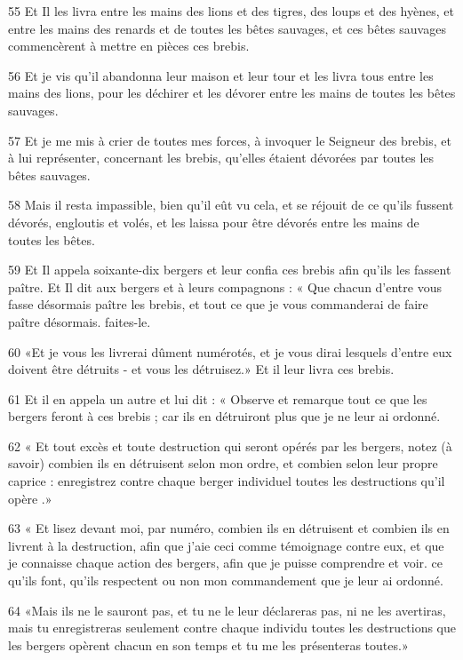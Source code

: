 \par 55 Et Il les livra entre les mains des lions et des tigres, des loups et des hyènes, et entre les mains des renards et de toutes les bêtes sauvages, et ces bêtes sauvages commencèrent à mettre en pièces ces brebis.
\par 56 Et je vis qu'il abandonna leur maison et leur tour et les livra tous entre les mains des lions, pour les déchirer et les dévorer entre les mains de toutes les bêtes sauvages.
\par 57 Et je me mis à crier de toutes mes forces, à invoquer le Seigneur des brebis, et à lui représenter, concernant les brebis, qu'elles étaient dévorées par toutes les bêtes sauvages.
\par 58 Mais il resta impassible, bien qu'il eût vu cela, et se réjouit de ce qu'ils fussent dévorés, engloutis et volés, et les laissa pour être dévorés entre les mains de toutes les bêtes.
\par 59 Et Il appela soixante-dix bergers et leur confia ces brebis afin qu'ils les fassent paître. Et Il dit aux bergers et à leurs compagnons : « Que chacun d'entre vous fasse désormais paître les brebis, et tout ce que je vous commanderai de faire paître désormais. faites-le.
\par 60 «Et je vous les livrerai dûment numérotés, et je vous dirai lesquels d'entre eux doivent être détruits - et vous les détruisez.» Et il leur livra ces brebis.
\par 61 Et il en appela un autre et lui dit : « Observe et remarque tout ce que les bergers feront à ces brebis ; car ils en détruiront plus que je ne leur ai ordonné.
\par 62 « Et tout excès et toute destruction qui seront opérés par les bergers, notez (à savoir) combien ils en détruisent selon mon ordre, et combien selon leur propre caprice : enregistrez contre chaque berger individuel toutes les destructions qu'il opère .»
\par 63 « Et lisez devant moi, par numéro, combien ils en détruisent et combien ils en livrent à la destruction, afin que j'aie ceci comme témoignage contre eux, et que je connaisse chaque action des bergers, afin que je puisse comprendre et voir. ce qu’ils font, qu’ils respectent ou non mon commandement que je leur ai ordonné.
\par 64 «Mais ils ne le sauront pas, et tu ne le leur déclareras pas, ni ne les avertiras, mais tu enregistreras seulement contre chaque individu toutes les destructions que les bergers opèrent chacun en son temps et tu me les présenteras toutes.»
